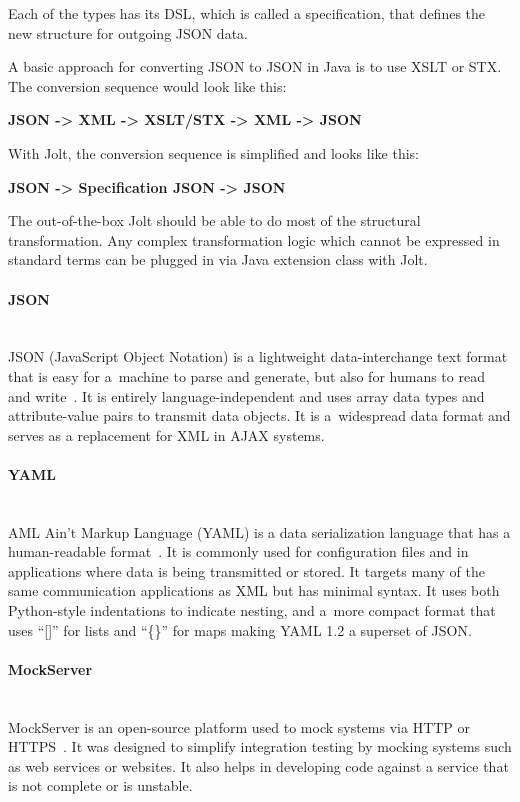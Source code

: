 Each of the types has its DSL, which is called a specification, that defines the new structure for outgoing JSON data.

A basic approach for converting JSON to JSON in Java is to use XSLT or STX. The conversion sequence would look like this:
\begin{center}
\textbf{JSON -> XML -> XSLT/STX -> XML -> JSON}
\end{center}

With Jolt, the conversion sequence is simplified and looks like this:
\begin{center}
\textbf{JSON -> Specification JSON -> JSON}
\end{center}

The out-of-the-box Jolt should be able to do most of the structural transformation. Any complex transformation logic which cannot be expressed in standard terms can be plugged in via Java extension class with Jolt.

\paragraph{\large{JSON}}\mbox{}\\[2pt]
JSON (JavaScript Object Notation) is a lightweight data-interchange text format that is easy for a~machine to parse and generate, but also for humans to read and write~\cite{json}. It is entirely language-independent and uses array data types and attribute-value pairs to transmit data objects. It is a~widespread data format and serves as a replacement for XML in AJAX systems.

\paragraph{\large{YAML}}\mbox{}\\[2pt]
AML Ain't Markup Language (YAML) is a data serialization language that has a human-readable format~\cite{yaml}. It is commonly used for configuration files and in applications where data is being transmitted or stored. It targets many of the same communication applications as XML but has minimal syntax. It uses both Python-style indentations to indicate nesting, and a~more compact format that uses ``[]'' for lists and ``\{\}'' for maps making YAML 1.2 a superset of JSON.

\paragraph{\large{MockServer}}\mbox{}\\[2pt]
MockServer is an open-source platform used to mock systems via HTTP or HTTPS~\cite{mockserver}. It was designed to simplify integration testing by mocking systems such as web services or websites. It also helps in developing code against a service that is not complete or is unstable.

